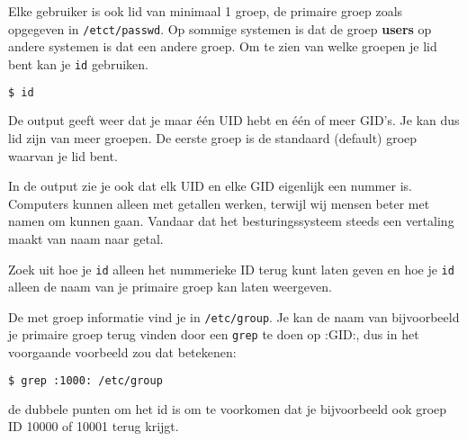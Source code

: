 Elke gebruiker is ook lid van minimaal 1 groep, de primaire groep zoals opgegeven in \texttt{/etct/passwd}. Op sommige systemen is dat de groep \textbf{users} op andere systemen is dat een andere groep. Om te zien van welke groepen je lid bent kan je \texttt{id} gebruiken.
\begin{lstlisting}[language=bash]
$ id
\end{lstlisting}
De output geeft weer dat je maar \'e\'en UID hebt en \'e\'en of meer GID's. Je kan dus lid zijn van meer groepen. De eerste groep is de standaard (default) groep waarvan je lid bent.

In de output zie je ook dat elk UID en elke GID eigenlijk een nummer is. Computers kunnen alleen met getallen werken, terwijl wij mensen beter met namen om kunnen gaan. Vandaar dat het besturingssysteem steeds een vertaling maakt van naam naar getal.

Zoek uit hoe je \texttt{id} alleen het nummerieke ID terug kunt laten geven en hoe je \texttt{id} alleen de naam van je primaire groep kan laten weergeven.

De  met groep informatie vind je in \texttt{/etc/group}. Je kan de naam van bijvoorbeeld je primaire groep terug vinden door een \texttt{grep} te doen op :GID:, dus in het voorgaande voorbeeld zou dat betekenen:
\begin{lstlisting}[language=bash]
$ grep :1000: /etc/group
\end{lstlisting}
de dubbele punten om het id is om te voorkomen dat je bijvoorbeeld ook groep ID 10000 of 10001 terug krijgt.
